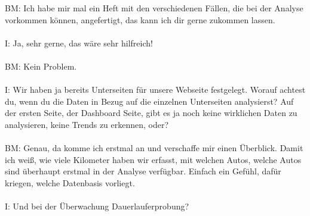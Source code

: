 \begin{linenumbers}
BM: Ich habe mir mal ein Heft mit den verschiedenen Fällen, die bei der Analyse vorkommen können, angefertigt, das kann ich dir gerne zukommen lassen.\\\\
I: Ja, sehr gerne, das wäre sehr hilfreich!\\\\
BM: Kein Problem.\\\\
I: Wir haben ja bereits Unterseiten für unsere Webseite festgelegt. Worauf achtest du, wenn du die Daten in Bezug auf die einzelnen Unterseiten analysierst? Auf der ersten Seite, der Dashboard Seite, gibt es ja noch keine wirklichen Daten zu analysieren, keine Trends zu erkennen, oder?\\\\
BM:  Genau, da komme ich erstmal an und verschaffe mir einen Überblick. Damit ich weiß, wie viele Kilometer haben wir erfasst, mit welchen Autos, welche Autos sind überhaupt erstmal in der Analyse verfügbar. Einfach ein Gefühl, dafür kriegen, welche Datenbasis vorliegt. \\\\
I: Und bei der Überwachung Dauerlauferprobung?\\\\

\end{linenumbers}
